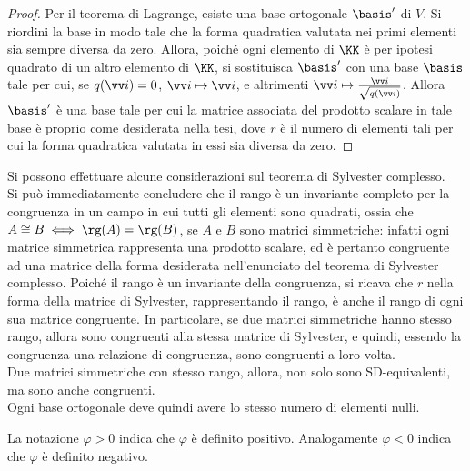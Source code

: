\documentclass[11pt]{article}
\begin{document}
	\begin{proof}
		Per il teorema di Lagrange, esiste una base ortogonale $\basis'$ di $V$.
		Si riordini la base in modo tale che la forma quadratica valutata nei primi elementi sia sempre diversa da zero. Allora, poiché ogni
		elemento di $\KK$ è per ipotesi quadrato di un altro elemento
		di $\KK$, si sostituisca $\basis'$ con una base $\basis$ tale per
		cui, se $q(\vv i) = 0$, $\vv i \mapsto \vv i$, e altrimenti
		$\vv i \mapsto \frac{\vv i}{\sqrt{q(\vv i)}}$. Allora $\basis'$
		è una base tale per cui la matrice associata del prodotto scalare
		in tale base è proprio come desiderata nella tesi, dove $r$ è
		il numero di elementi tali per cui la forma quadratica valutata
		in essi sia diversa da zero.
	\end{proof}

	\begin{remark}
		Si possono effettuare alcune considerazioni sul teorema di Sylvester
		complesso. \\
		
		\li Si può immediatamente concludere che il rango è un invariante
		completo per la congruenza in un campo in cui tutti gli elementi
		sono quadrati, ossia che $A \cong B \iff \rg(A) = \rg(B)$, se $A$ e
		$B$ sono matrici simmetriche: infatti
		ogni matrice simmetrica rappresenta una prodotto scalare, ed è
		pertanto congruente ad una matrice della forma desiderata
		nell'enunciato del teorema di Sylvester complesso. Poiché il rango
		è un invariante della congruenza, si ricava che $r$ nella forma
		della matrice di Sylvester, rappresentando il rango, è anche
		il rango di ogni sua matrice congruente. In particolare, se due
		matrici simmetriche hanno stesso rango, allora sono congruenti
		alla stessa matrice di Sylvester, e quindi, essendo la congruenza
		una relazione di congruenza, sono congruenti a loro volta. \\
		\li Due matrici simmetriche con stesso rango, allora, non solo
		sono SD-equivalenti, ma sono anche congruenti. \\
		\li Ogni base ortogonale deve quindi avere lo stesso numero
		di elementi nulli.
	\end{remark}

	\begin{note}
		La notazione $\varphi > 0$ indica che $\varphi$ è definito positivo.
		Analogamente $\varphi < 0$ indica che $\varphi$ è definito negativo.
	\end{note}
\end{document}
